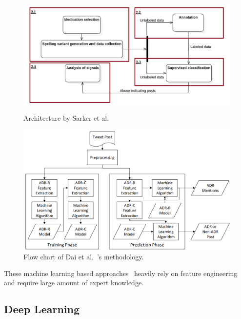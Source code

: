 \begin{figure}[h]
	\centering
	\begin{minipage}{0.45\textwidth}
		\includegraphics[width=0.99\linewidth]{Figures/h.png}
		\caption{Architecture by Sarker et al.~\cite{sarker2016social}}
		\label{fig:model-sarker}
	\end{minipage}
	\hfill
	\begin{minipage}{0.45\textwidth}
		\includegraphics[width=0.99\linewidth]{Figures/r.png}
		\caption{Flow chart of Dai et al.~\cite{dai2016feature}’s methodology.}
		\label{fig:flowchart-alvaro}
	\end{minipage}
\end{figure}


These machine learning based approaches~\cite{jonnagaddala2016binary, sarker2016social, zhang2016ensemble, dai2016feature, alimova2017automated} heavily rely on feature engineering and require large amount of expert knowledge.

\subsection{Deep Learning}

